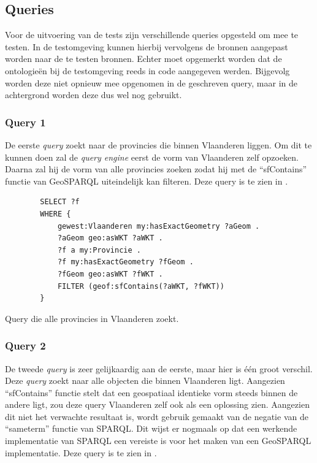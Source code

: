 \subsection{Queries}
Voor de uitvoering van de tests zijn verschillende queries opgesteld om mee te testen. In de testomgeving kunnen hierbij vervolgens de bronnen aangepast worden naar de te testen bronnen. Echter moet opgemerkt worden dat de ontologieën bij de testomgeving reeds in code aangegeven werden. Bijgevolg worden deze niet opnieuw mee opgenomen in de geschreven query, maar in de achtergrond worden deze dus wel nog gebruikt.

\subsubsection{Query 1}
De eerste \textit{query} zoekt naar de provincies die binnen Vlaanderen liggen. Om dit te kunnen doen zal de \textit{query engine} eerst de vorm van Vlaanderen zelf opzoeken. Daarna zal hij de vorm van alle provincies zoeken zodat hij met de ``sfContains'' functie van GeoSPARQL uiteindelijk kan filteren. Deze query is te zien in .

\begin{listing}[ht]
    \begin{verbatim}
        SELECT ?f
        WHERE {
            gewest:Vlaanderen my:hasExactGeometry ?aGeom .
            ?aGeom geo:asWKT ?aWKT .
            ?f a my:Provincie .
            ?f my:hasExactGeometry ?fGeom .
            ?fGeom geo:asWKT ?fWKT .
            FILTER (geof:sfContains(?aWKT, ?fWKT))
        }
    \end{verbatim}
    \caption{Query die alle provincies in Vlaanderen zoekt.}
    \label{listing:find_provinces_flanders}
\end{listing}


\subsubsection{Query 2}
De tweede \textit{query} is zeer gelijkaardig aan de eerste, maar hier is één groot verschil. Deze \textit{query} zoekt naar alle objecten die binnen Vlaanderen ligt. Aangezien ``sfContains'' functie stelt dat een geospatiaal identieke vorm steeds binnen de andere ligt, zou deze query Vlaanderen zelf ook als een oplossing zien. Aangezien dit niet het verwachte resultaat is, wordt gebruik gemaakt van de negatie van de ``sameterm'' functie van SPARQL. Dit wijst er nogmaals op dat een werkende implementatie van SPARQL een vereiste is voor het maken van een GeoSPARQL implementatie. Deze query is te zien in .

